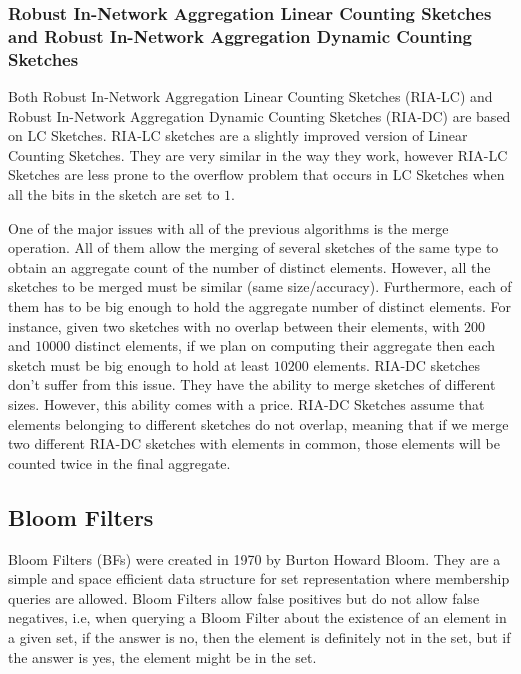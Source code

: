 \subsubsection{Robust In-Network Aggregation Linear Counting Sketches
  and  Robust In-Network Aggregation  Dynamic Counting Sketches}
\label{sec:robust-netw-linear}
Both Robust In-Network Aggregation Linear Counting Sketches (RIA-LC)
\cite{Fan:2008wl,YaoChungFanArbeeLPChen:2010to} and Robust In-Network
Aggregation Dynamic Counting Sketches (RIA-DC)
\cite{YaoChungFanArbeeLPChen:2010to} are based on LC Sketches. RIA-LC
sketches are a slightly improved version of Linear Counting Sketches.
They are very similar in the way they work, however RIA-LC Sketches
are less prone to the overflow problem that occurs in LC Sketches when
all the bits in the sketch are set to $1$.

One of the major issues with all of the previous algorithms is the
merge operation. All of them allow the merging of several sketches of
the same type to obtain an aggregate count of the number of distinct
elements. However, all the sketches to be merged must be similar (same
size/accuracy). Furthermore, each of them has to be big enough to hold
the aggregate number of distinct elements. For instance, given two
sketches with no overlap between their elements, with $200$ and
$10000$ distinct elements, if we plan on computing their aggregate 
then each sketch must be big enough to hold at least $10200$ elements.
RIA-DC sketches don't suffer from this issue. They have the ability to
merge sketches of different sizes. However, this ability comes with a
price. RIA-DC Sketches assume that elements belonging to different
sketches do not overlap, meaning that if we merge two
different RIA-DC sketches with elements in common, those elements will
be counted twice in the final aggregate.

\subsection{Bloom Filters}
\label{sec:bloom_filters}

Bloom Filters (BFs) were created in 1970 \cite{Bloom1970} by Burton
Howard Bloom. They are a simple and space efficient data structure for
set representation where membership queries are allowed. Bloom Filters
allow false positives but do not allow false negatives, i.e, when
querying a Bloom Filter about the existence of an element in a given
set, if the answer is no, then the element is definitely not in the
set, but if the answer is yes, the element might be in the set.

